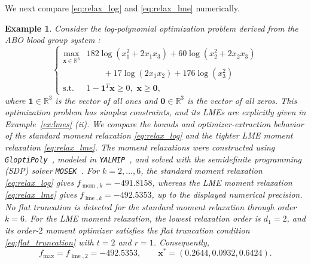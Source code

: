 \documentclass[pdflatex,sn-mathphys-num]{sn-jnl}%
\newcommand{\re}{\mathbb{R}}
\newcommand{\vect}[1]{\boldsymbol{#1}}
\newcommand{\st}{\mathrm{s.t.}}
\theoremstyle{thmstyleone}%
\theoremstyle{thmstyletwo}%
\newtheorem{example}{Example}%
\theoremstyle{thmstylethree}%
\begin{document}
We next compare \eqref{eq:relax_log} and \eqref{eq:relax_lme}
numerically.


\begin{example}\label{ex:ABO}
	Consider the log-polynomial optimization problem derived from the 
	ABO blood group system \cite{EMBook}:
	\begin{equation}\label{eq:ABO}
		\left\{\begin{array}{cl}
			\max\limits_{\vect{x}\in\re^3} 
			& 182 \log (x_1^2+2x_1x_3)+ 60 \log (x_2^2+2x_2x_3)\\
			&\qquad + 17 \log(2x_1x_2) + 176 \log (x_3^2)\\
			\st & 1-\mathbf{1}^T\vect{x} \ge 0,\,\, \vect{x} \geq \mathbf{0},
		\end{array}\right.
	\end{equation}
	where $\mathbf{1}\in\re^3$ is the vector of all ones and 
	$\mathbf{0}\in\re^3$ is the vector of all zeros.
	This optimization problem has simplex constraints, 
	and its LMEs are explicitly given in Example~\ref{ex:lmes} (ii). 
	We compare the bounds and optimizer-extraction behavior of the
	standard moment relaxation \eqref{eq:relax_log} and the tighter LME
	moment relaxation \eqref{eq:relax_lme}.
	The moment relaxations were constructed using
	\texttt{GloptiPoly}~\cite{GloptiPoly}, modeled in
	\texttt{YALMIP}~\cite{Yalmip}, and solved with the semidefinite
	programming (SDP) solver \texttt{MOSEK}~\cite{mosek}.
{\color{red}
For $k=2,\ldots,6$, the standard moment relaxation
\eqref{eq:relax_log} gives
$f_{\operatorname{mom},k}=-491.8158$, whereas the LME moment
relaxation \eqref{eq:relax_lme} gives
$f_{\operatorname{lme},k}=-492.5353$, up to the displayed numerical
precision. No flat truncation is detected for the standard moment
relaxation through order $k=6$. For the LME moment relaxation,
 the lowest relaxation order is $d_1=2$, and its order-$2$ moment
optimizer satisfies the flat truncation condition
\eqref{eq:flat_truncation} with $t=2$ and $r=1$. Consequently,
\[
f_{\max}=f_{\operatorname{lme},2}=-492.5353,
\qquad
\vect{x}^*=(0.2644,0.0932,0.6424).
\]
}
\end{example}
\end{document}
